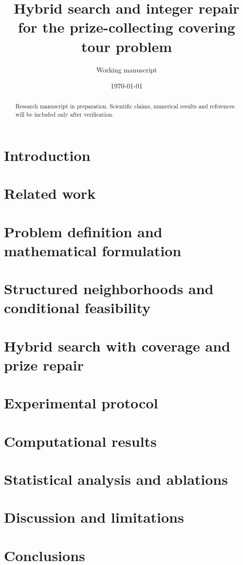 \documentclass[12pt]{article}
\title{Hybrid search and integer repair for the prize-collecting covering tour problem}
\author{Working manuscript}
\date{\today}
\begin{document}
\maketitle
\begin{abstract}
Research manuscript in preparation. Scientific claims, numerical results and references will be included only after verification.
\end{abstract}
\section{Introduction}

\section{Related work}

\section{Problem definition and mathematical formulation}

\section{Structured neighborhoods and conditional feasibility}

\section{Hybrid search with coverage and prize repair}

\section{Experimental protocol}

\section{Computational results}


\section{Statistical analysis and ablations}


\section{Discussion and limitations}

\section{Conclusions}


\end{document}
